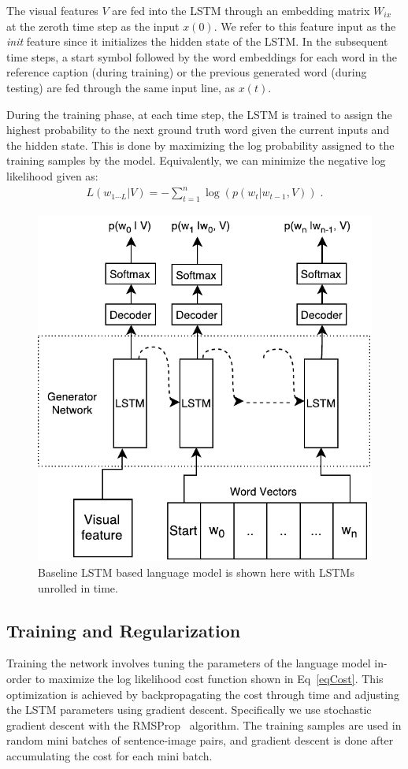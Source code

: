 The visual features $V$ are fed into the LSTM through an embedding matrix
$W_{ix}$ at the zeroth time step as the input $x(0)$.
We refer to this feature input as the \emph{init} feature since it initializes
the hidden state of the LSTM.
In the subsequent time steps, a start symbol followed by the word embeddings for
each word in the reference caption (during training) or the previous generated
word (during testing) are fed through the same input line, as $x(t)$.

During the training phase, at each time step, the LSTM is trained to assign the
highest probability to the next ground truth word given the current inputs and
the hidden state.
This is done by maximizing the log probability assigned to the training samples
by the model. Equivalently, we can minimize the negative log likelihood given
as:
\begin{align}
  \label{eqCost}
  L(w_{1\cdots L} | V) = -\sum_{t=1}^n \log(p(w_t|w_{t-1},V)) \; .
\end{align}
\begin{figure}[h]
\begin{center}
   \includegraphics[width=0.5\linewidth]{images/Thesis_lstmLangGen.pdf}
\end{center}
\vspace*{-4mm}
\caption{Baseline LSTM based language model is shown here with
  LSTMs unrolled in time.}
\label{fig:baselinelstmlang}
\end{figure}

\subsection{Training and Regularization}
Training the network involves tuning the parameters of the language model
in-order to maximize the log likelihood cost function shown in Eq~\ref{eqCost}.
This optimization is achieved by backpropagating the cost through time and
adjusting the LSTM parameters using gradient descent.
Specifically we use stochastic gradient descent with the
RMSProp~\cite{rmspropTielman} algorithm.
The training samples are used in random mini batches of sentence-image pairs,
and gradient descent is done after accumulating the cost for each mini batch. 

